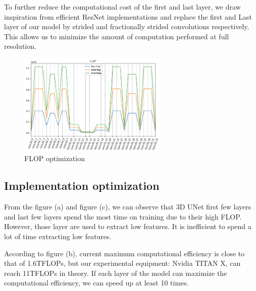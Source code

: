 \documentclass[runningheads]{llncs}
\begin{document}
To further reduce the computational cost of the first and last layer, 
we draw inspiration from efficient ResNet implementations and replace the first and
Last layer of our model by strided and fractionally strided convolutions respectively.
This allows us to minimize the amount of computation performed at full resolution.

\begin{figure}[h]
\centering
\includegraphics[width=2.8in]{optimize_model_FLOP.png}
\caption{FLOP optimization}
\end{figure}%


%
%
%
%
%
\subsection{Implementation optimization}



From the figure (a) and figure (c), we can observe that 3D UNet first few layers and last few layers spend the most time on training due to their high FLOP. 
However, those layer are used to extract low features. It is inefficient to spend a lot of time extracting low features.

According to figure (b), current maximum computational efficiency is close to that of 1.6TFLOPs, but our experimental equipment: Nvidia TITAN X, can reach 11TFLOPs in theory. If each layer of the model can maximize the computational efficiency, we can speed up at least 10 times. 





\end{document}
